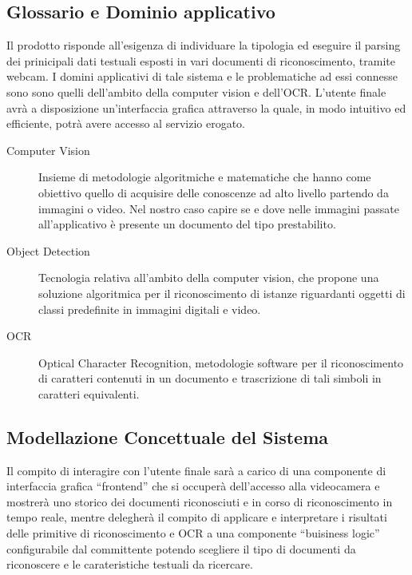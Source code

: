 \documentclass[12pt,a4paper]{article}
\begin{document}
\subsection{Glossario e Dominio applicativo}

Il prodotto risponde all'esigenza di individuare la tipologia ed
eseguire il parsing dei prinicipali dati testuali esposti in vari
documenti di riconoscimento, tramite webcam.
I domini applicativi di tale sistema e le problematiche ad essi connesse
sono sono quelli dell'ambito della computer vision e dell'OCR.
L'utente finale avrà a disposizione un'interfaccia grafica attraverso la
quale, in modo intuitivo ed efficiente, potrà avere accesso al servizio
erogato.

\begin{description}
    \item[Computer Vision] Insieme di metodologie algoritmiche e
        matematiche che hanno come obiettivo quello di acquisire delle
        conoscenze ad alto livello partendo da immagini o video. Nel
        nostro caso capire se e dove nelle immagini passate
        all'applicativo è presente un documento del tipo prestabilito.
    \item[Object Detection] Tecnologia relativa all'ambito della
        computer vision, che propone una soluzione algoritmica per il
        riconoscimento di istanze riguardanti oggetti di classi
        predefinite in immagini digitali e video.
    \item[OCR] Optical Character Recognition, metodologie software per
        il riconoscimento di caratteri contenuti in un documento e
        trascrizione di tali simboli in caratteri equivalenti.
\end{description}

\subsection{Modellazione Concettuale del Sistema}

Il compito di interagire con l'utente finale sarà a carico di una
componente di interfaccia grafica ``frontend'' che si occuperà
dell'accesso alla videocamera e mostrerà uno storico dei documenti
riconosciuti e in corso di riconoscimento in tempo reale, mentre
delegherà il compito di applicare e interpretare i risultati delle
primitive di riconoscimento e OCR a una componente ``buisiness logic''
configurabile dal committente potendo scegliere il tipo di documenti da
riconoscere e le carateristiche testuali da ricercare.
\end{document}
